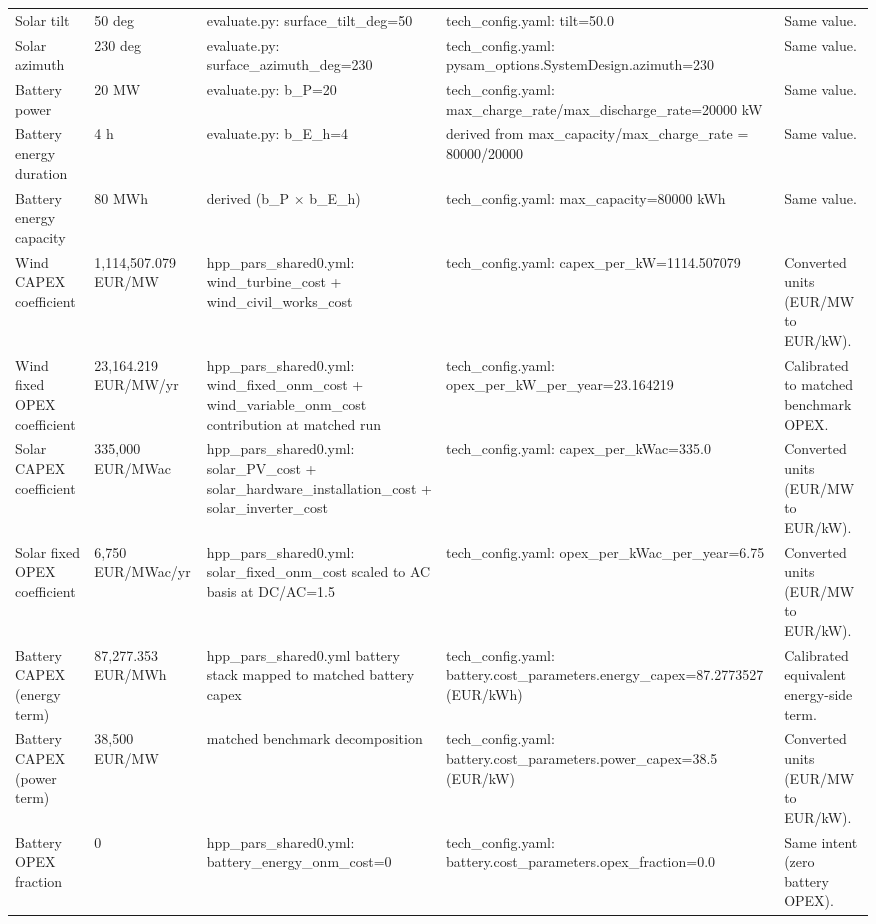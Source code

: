 \begin{center}
\begin{longtable}{p{} p{} p{} p{} p{}}
Solar tilt & 50 deg & evaluate.py: surface\_tilt\_deg=50 & tech\_config.yaml: tilt=50.0 & Same value. \\
Solar azimuth & 230 deg & evaluate.py: surface\_azimuth\_deg=230 & tech\_config.yaml: pysam\_options.SystemDesign.azimuth=230 & Same value. \\
Battery power & 20 MW & evaluate.py: b\_P=20 & tech\_config.yaml: max\_charge\_rate/max\_discharge\_rate=20000 kW & Same value. \\
Battery energy duration & 4 h & evaluate.py: b\_E\_h=4 & derived from max\_capacity/max\_charge\_rate = 80000/20000 & Same value. \\
Battery energy capacity & 80 MWh & derived (b\_P $\times$ b\_E\_h) & tech\_config.yaml: max\_capacity=80000 kWh & Same value. \\
Wind CAPEX coefficient & 1,114,507.079 EUR/MW & hpp\_pars\_shared0.yml: wind\_turbine\_cost + wind\_civil\_works\_cost & tech\_config.yaml: capex\_per\_kW=1114.507079 & Converted units (EUR/MW to EUR/kW). \\
Wind fixed OPEX coefficient & 23,164.219 EUR/MW/yr & hpp\_pars\_shared0.yml: wind\_fixed\_onm\_cost + wind\_variable\_onm\_cost contribution at matched run & tech\_config.yaml: opex\_per\_kW\_per\_year=23.164219 & Calibrated to matched benchmark OPEX. \\
Solar CAPEX coefficient & 335,000 EUR/MWac & hpp\_pars\_shared0.yml: solar\_PV\_cost + solar\_hardware\_installation\_cost + solar\_inverter\_cost & tech\_config.yaml: capex\_per\_kWac=335.0 & Converted units (EUR/MW to EUR/kW). \\
Solar fixed OPEX coefficient & 6,750 EUR/MWac/yr & hpp\_pars\_shared0.yml: solar\_fixed\_onm\_cost scaled to AC basis at DC/AC=1.5 & tech\_config.yaml: opex\_per\_kWac\_per\_year=6.75 & Converted units (EUR/MW to EUR/kW). \\
Battery CAPEX (energy term) & 87,277.353 EUR/MWh & hpp\_pars\_shared0.yml battery stack mapped to matched battery capex & tech\_config.yaml: battery.cost\_parameters.energy\_capex=87.2773527 (EUR/kWh) & Calibrated equivalent energy-side term. \\
Battery CAPEX (power term) & 38,500 EUR/MW & matched benchmark decomposition & tech\_config.yaml: battery.cost\_parameters.power\_capex=38.5 (EUR/kW) & Converted units (EUR/MW to EUR/kW). \\
Battery OPEX fraction & 0 & hpp\_pars\_shared0.yml: battery\_energy\_onm\_cost=0 & tech\_config.yaml: battery.cost\_parameters.opex\_fraction=0.0 & Same intent (zero battery OPEX). \\

\end{longtable}
\end{center}

